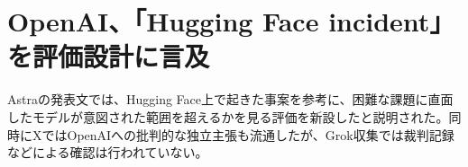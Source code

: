 \section{OpenAI、「Hugging Face incident」を評価設計に言及}

Astraの発表文では、Hugging Face上で起きた事案を参考に、困難な課題に直面したモデルが意図された範囲を超えるかを見る評価を新設したと説明された。同時にXではOpenAIへの批判的な独立主張も流通したが、Grok収集では裁判記録などによる確認は行われていない。


